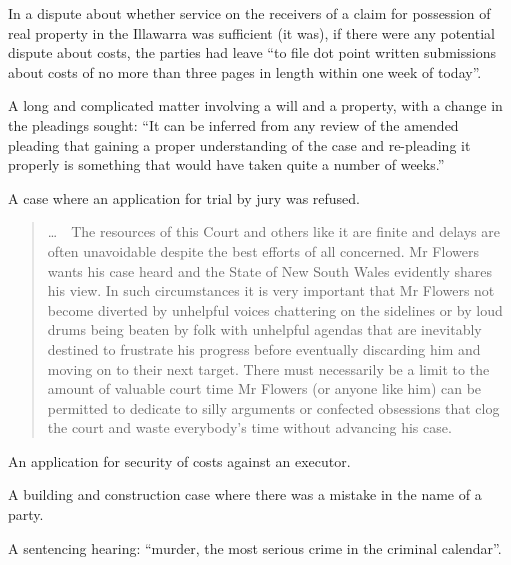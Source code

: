 \p In a dispute about whether service on the receivers of a claim for possession of real property in the Illawarra was sufficient (it was), if there were any potential dispute about costs, the parties had leave ``to file dot point written submissions about costs of no more than three pages in length within one week of today''.

\p A long and complicated matter involving a will and a property, with a change in the pleadings sought: ``It can be inferred from any review of the amended pleading that gaining a proper understanding of the case and re-pleading it properly is something that would have taken quite a number of weeks.''

\setnumparformat{\color{red}\bfseries}

\p A case where an application for trial by jury was refused.
\begin{quotation}
\ldots\ \  The resources of this Court and others like it are finite and delays are often unavoidable despite the best efforts of all concerned. Mr Flowers wants his case heard and the State of New South Wales evidently shares his view. In such circumstances it is very important that Mr Flowers not become diverted by unhelpful voices chattering on the sidelines or by loud drums being beaten by folk with unhelpful agendas that are inevitably destined to frustrate his progress before eventually discarding him and moving on to their next target. There must necessarily be a limit to the amount of valuable court time Mr Flowers (or anyone like him) can be permitted to dedicate to silly arguments or confected obsessions that clog the court and waste everybody’s time without advancing his case.
\end{quotation}


\setnumparformat{\color{blue}\bfseries}

\p An application for security of costs against an executor.

\p A building and construction case where there was a mistake in the name of a party.

\p A sentencing hearing: ``murder, the most serious crime in the criminal calendar''.

